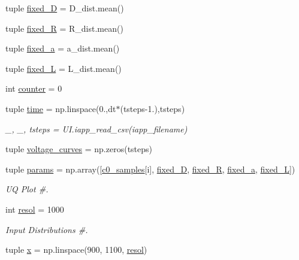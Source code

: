 \begin{DoxyCompactItemize}
\item 
tuple \hyperlink{namespace_uncertainty___propagation_ac8e1acccb8fb7e4ce7cfa77a304e936a}{fixed\-\_\-\-D} = D\-\_\-dist.\-mean()
\item 
tuple \hyperlink{namespace_uncertainty___propagation_a717d6bc98a4bbaa2fa30403b79e42b1e}{fixed\-\_\-\-R} = R\-\_\-dist.\-mean()
\item 
tuple \hyperlink{namespace_uncertainty___propagation_ade6c2eeacf12db0e1ea6a9a5c8379591}{fixed\-\_\-a} = a\-\_\-dist.\-mean()
\item 
tuple \hyperlink{namespace_uncertainty___propagation_adf3a46710b42fda247caf73278ffca4d}{fixed\-\_\-\-L} = L\-\_\-dist.\-mean()
\item 
int \hyperlink{namespace_uncertainty___propagation_a617a47c70795bcff659815ad0efd2266}{counter} = 0
\item 
tuple \hyperlink{namespace_uncertainty___propagation_a429c35172fbcb8b1788bead147e4719b}{time} = np.\-linspace(0.,dt$\ast$(tsteps-\/1.),tsteps)
\begin{DoxyCompactList}\small\item\em \-\_\-, \-\_\-, tsteps = U\-I.\-iapp\-\_\-read\-\_\-csv(iapp\-\_\-filename) \end{DoxyCompactList}\item 
tuple \hyperlink{namespace_uncertainty___propagation_ad561e9e5b642db23d892d0aaf51d02d6}{voltage\-\_\-curves} = np.\-zeros(tsteps)
\item 
tuple \hyperlink{namespace_uncertainty___propagation_a347fcfb484b5d7bf36cc0b53a589be83}{params} = np.\-array(\mbox{[}\hyperlink{namespace_uncertainty___propagation_ae2539890c28b90e3780f315d426c1ba6}{c0\-\_\-samples}\mbox{[}i\mbox{]}, \hyperlink{namespace_uncertainty___propagation_ac8e1acccb8fb7e4ce7cfa77a304e936a}{fixed\-\_\-\-D}, \hyperlink{namespace_uncertainty___propagation_a717d6bc98a4bbaa2fa30403b79e42b1e}{fixed\-\_\-\-R}, \hyperlink{namespace_uncertainty___propagation_ade6c2eeacf12db0e1ea6a9a5c8379591}{fixed\-\_\-a}, \hyperlink{namespace_uncertainty___propagation_adf3a46710b42fda247caf73278ffca4d}{fixed\-\_\-\-L}\mbox{]})
\begin{DoxyCompactList}\small\item\em U\-Q Plot \#. \end{DoxyCompactList}\item 
int \hyperlink{namespace_uncertainty___propagation_a4737e7c4408908bc86898057096fd8bf}{resol} = 1000
\begin{DoxyCompactList}\small\item\em Input Distributions \#. \end{DoxyCompactList}\item 
tuple \hyperlink{namespace_uncertainty___propagation_a7a74e6f2f6355f34b63513f77c839a9e}{x} = np.\-linspace(900, 1100, \hyperlink{namespace_uncertainty___propagation_a4737e7c4408908bc86898057096fd8bf}{resol})
\end{DoxyCompactItemize}


